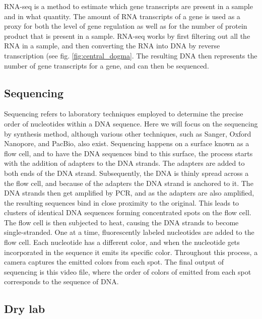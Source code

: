 RNA-seq is a method to estimate which gene transcripts are present in a sample and in what quantity. The amount of RNA transcripts of a gene is used as a proxy for both the level of gene regulation as well as for the number of protein product that is present in a sample. RNA-seq works by first filtering out all the RNA in a sample, and then converting the RNA into DNA by reverse transcription (see fig. \ref{fig:central_dogma}. The resulting DNA then represents the number of gene transcripts for a gene, and can then be sequenced.

\subsection{Sequencing}

Sequencing refers to laboratory techniques employed to determine the precise order of nucleotides within a DNA sequence. Here we will focus on the sequencing by synthesis method, although various other techniques, such as Sanger, Oxford Nanopore, and PacBio, also exist. Sequencing happens on a surface known as a flow cell, and to have the DNA sequences bind to this surface, the process starts with the addition of adapters to the DNA strands. The adapters are added to both ends of the DNA strand. Subsequently, the DNA is thinly spread across a the flow cell, and because of the adapters the DNA strand is anchored to it. The DNA strands then get amplified by PCR, and as the adapters are also amplified, the resulting sequences bind in close proximity to the original. This leads to clusters of identical DNA sequences forming concentrated spots on the flow cell. The flow cell is then subjected to heat, causing the DNA strands to become single-stranded. One at a time, fluorescently labeled nucleotides are added to the flow cell. Each nucleotide has a different color, and when the nucleotide gets incorporated in the sequence it emits its specific color. Throughout this process, a camera captures the emitted colors from each spot. The final output of sequencing is this video file, where the order of colors of emitted from each spot corresponds to the sequence of DNA.

\subsection{Dry lab}

